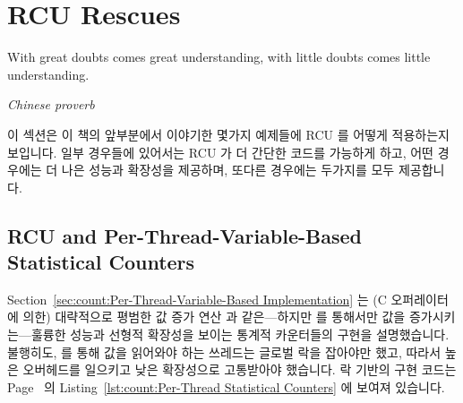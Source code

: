 
\section{RCU Rescues}
\label{sec:together:RCU Rescues}
%
\epigraph{With great doubts comes great understanding, with little doubts
	  comes little understanding.}
	 {\emph{Chinese proverb}}

이 섹션은 이 책의 앞부분에서 이야기한 몇가지 예제들에 RCU 를 어떻게
적용하는지 보입니다.
일부 경우들에 있어서는 RCU 가 더 간단한 코드를 가능하게 하고, 어떤 경우에는 더
나은 성능과 확장성을 제공하며, 또다른 경우에는 두가지를 모두 제공합니다.
\iffalse

This section shows how to apply RCU to some examples discussed earlier
in this book.
In some cases, RCU provides simpler code, in other cases better
performance and scalability, and in still other cases, both.
\fi

\subsection{RCU and Per-Thread-Variable-Based Statistical Counters}
\label{sec:together:RCU and Per-Thread-Variable-Based Statistical Counters}

Section~\ref{sec:count:Per-Thread-Variable-Based Implementation}
는 (C \co{++} 오퍼레이터에 의한) 대략적으로 평범한 값 증가 연산 과
같은---하지만 를 통해서만 값을 증가시키는---훌륭한 성능과
선형적 확장성을 보이는 통계적 카운터들의 구현을 설명했습니다.
불행히도,  를 통해 값을 읽어와야 하는 쓰레드는 글로벌 락을
잡아야만 했고, 따라서 높은 오버헤드를 일으키고 낮은 확장성으로 고통받아야
했습니다.  락 기반의 구현 코드는
Page~\pageref{lst:count:Per-Thread Statistical Counters} 의
Listing~\ref{lst:count:Per-Thread Statistical Counters} 에 보여져 있습니다.
\iffalse

Section~\ref{sec:count:Per-Thread-Variable-Based Implementation}
described an implementation of statistical counters that provided
excellent
performance, roughly that of simple increment (as in the C \co{++}
operator), and linear scalability---but only for incrementing
via \co{inc_count()}.
Unfortunately, threads needing to read out the value via \co{read_count()}
were required to acquire a global
lock, and thus incurred high overhead and suffered poor scalability.
The code for the lock-based implementation is shown in
Listing~\ref{lst:count:Per-Thread Statistical Counters} on
Page~\pageref{lst:count:Per-Thread Statistical Counters}.
\fi

